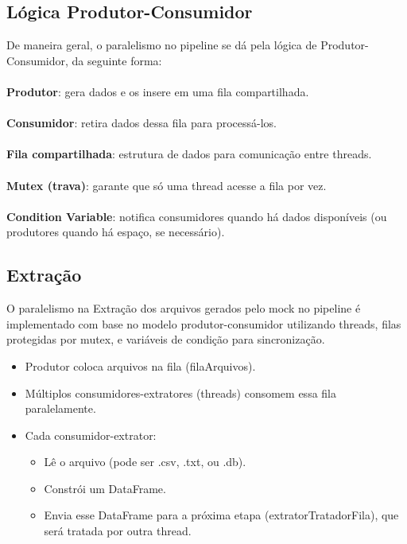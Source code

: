 \documentclass[a4paper,12pt]{article}
\begin{document}
\subsection*{Lógica Produtor-Consumidor}
De maneira geral, o paralelismo no pipeline se dá pela lógica de Produtor-Consumidor, da seguinte forma:
\\
\\
\textbf{Produtor}: gera dados e os insere em uma fila compartilhada.
\\
\\
\textbf{Consumidor}: retira dados dessa fila para processá-los.
\\
\\
\textbf{Fila compartilhada}: estrutura de dados para comunicação entre threads.
\\
\\
\textbf{Mutex (trava)}: garante que só uma thread acesse a fila por vez.
\\
\\
\textbf{Condition Variable}: notifica consumidores quando há dados disponíveis (ou produtores quando há espaço, se necessário).



\subsection*{Extração}
O paralelismo na Extração dos arquivos gerados pelo mock no pipeline é implementado com base no modelo produtor-consumidor utilizando threads, filas protegidas por mutex, e variáveis de condição para sincronização.

\begin{itemize}
    \item Produtor coloca arquivos na fila (filaArquivos).

    \item  Múltiplos consumidores-extratores (threads) consomem essa fila paralelamente.

    \item  Cada consumidor-extrator:
    \begin{itemize}
        \item Lê o arquivo (pode ser .csv, .txt, ou .db).
        \item Constrói um DataFrame.
        \item Envia esse DataFrame para a próxima etapa (extratorTratadorFila), que será tratada por outra thread.
    \end{itemize}

\end{itemize}
\end{document}
